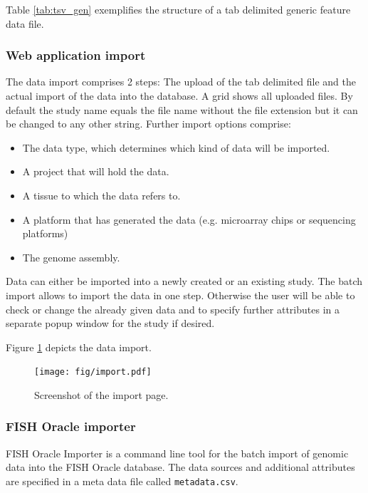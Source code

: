 \documentclass[11pt,final]{article}
\begin{document}
Table \ref{tab:tsv_gen} exemplifies the structure of a tab delimited
generic feature data file.

\subsubsection{Web application import}
\label{web-import}

The data import comprises 2 steps: The upload of the tab delimited file and
the actual import of the data into the database. A grid shows all uploaded
files. By default the study name equals the file name without the file
extension but it can be changed to any other string.
Further import options comprise: 

\begin{itemize}
  \item The data type, which determines which kind of data will be imported.
  \item A project that will hold the data.
  \item A tissue to which the data refers to.
  \item A platform that has generated the data (e.g. microarray chips or
        sequencing platforms)
  \item The genome assembly.
\end{itemize}

Data can either be imported into a newly created or an existing study. 
The batch import allows to import the data in one step. Otherwise the
user will be able to check or change the already given data and to
specify further attributes in a separate popup window for the study
if desired.

Figure \ref{fig:import} depicts the data import.

\begin{figure}[h]
	\begin{center}
	  \texttt{[image: fig/import.pdf]}
	\end{center}
	\caption{Screenshot of the import page.}
	\label{fig:import}
\end{figure}

\subsubsection{FISH Oracle importer}
\label{batch-importer}

FISH Oracle Importer is a command line tool for the batch import of genomic
data into the FISH Oracle database. The data sources and additional attributes
are specified in a meta data file called \texttt{metadata.csv}. 
\end{document}
